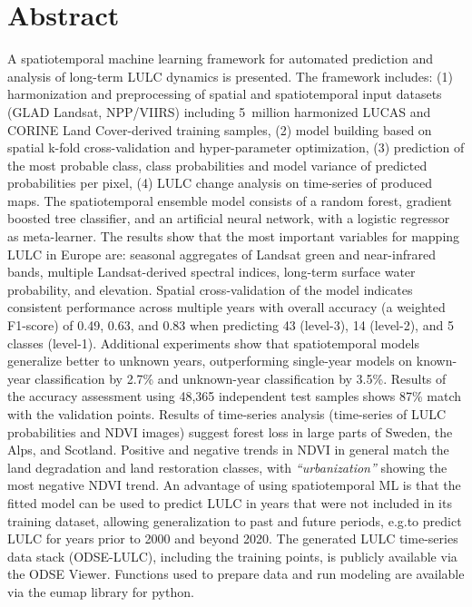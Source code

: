 \section*{Abstract}
A spatiotemporal machine learning framework for automated prediction and analysis of long-term LULC dynamics is presented. The framework includes: (1) harmonization and preprocessing of 
spatial and spatiotemporal input datasets (GLAD Landsat, NPP/VIIRS) including 5~million harmonized LUCAS and CORINE Land Cover-derived training samples, (2) model building based on spatial k-fold cross-validation and hyper-parameter optimization, (3) prediction of the most probable class, class probabilities and model variance of predicted probabilities per pixel, (4) LULC change analysis on time-series of produced maps. The spatiotemporal ensemble model consists of a random forest, gradient boosted tree classifier, and an artificial neural network, with a logistic regressor as meta-learner. The results show that the most important variables for mapping LULC in Europe are: seasonal aggregates of Landsat green and near-infrared bands, multiple Landsat-derived spectral indices, long-term surface water probability, and elevation. Spatial cross-validation of the model indicates consistent performance across multiple years with overall accuracy (a weighted F1-score) of 0.49, 0.63, and 0.83 when predicting 43 (level-3), 14 (level-2), and 5 classes (level-1). 
Additional experiments show that spatiotemporal models generalize better to unknown years, outperforming single-year models on known-year classification by 2.7\% and unknown-year classification by 3.5\%. Results of the accuracy assessment using 48,365 independent test samples shows 87\% match with the validation points. Results of time-series analysis (time-series of LULC probabilities and NDVI images) suggest forest loss in large parts of Sweden, the Alps, and Scotland. Positive and negative trends in NDVI in general match the land degradation and land restoration classes, with \emph{``urbanization''} showing the most negative NDVI trend. An advantage of using spatiotemporal ML is that the fitted model can be used to predict LULC in years that were not included in its training dataset, allowing generalization to past and future periods, e.g.\@ to predict LULC for years prior to 2000 and beyond 2020. The generated LULC time-series data stack (ODSE-LULC), including the training points, is publicly available via the ODSE Viewer. Functions used to prepare data and run modeling are available via the \textsf{eumap} library for python.

